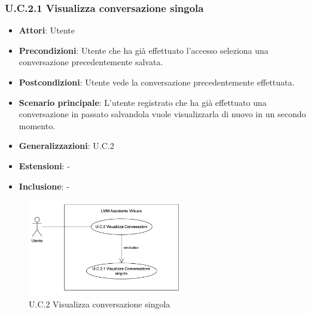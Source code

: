 \subsubsection{U.C.2.1 Visualizza conversazione singola}
\begin{itemize}
    \item \textbf{Attori}: Utente
    \item \textbf{Precondizioni}: Utente che ha già effettuato l’accesso seleziona una conversazione precedentemente salvata.
    \item \textbf{Postcondizioni}: Utente vede la conversazione precedentemente effettuata.
    \item \textbf{Scenario principale}: L’utente registrato che ha già effettuato una conversazione in passato salvandola vuole visualizzarla di nuovo in un secondo momento.
    \item \textbf{Generalizzazioni}: U.C.2
    \item \textbf{Estensioni}: -
    \item \textbf{Inclusione}: -
\end{itemize}
\begin{figure}[h!]
    \centering
    \includegraphics[width=0.6\textwidth]{img/UC2-1.png}
    \caption{U.C.2 Visualizza conversazione singola}
\end{figure}
